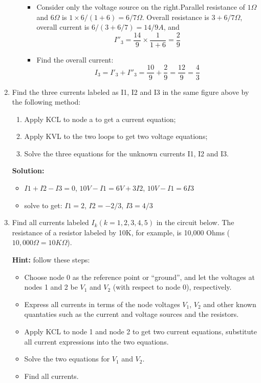 \begin{enumerate}
\begin{enumerate}
\begin{itemize}
\item Consider only the voltage source on the right.Parallel resistance
of $1\Omega$ and $6\Omega$ is $1\times 6/(1+6)=6/7\Omega$. Overall resistance
is $3+6/7\Omega$, overall current is $6/(3+6/7)=14/9A$, and
\[	I''_3=\frac{14}{9}\times \frac{1}{1+6}=\frac{2}{9} \]

\item Find the overall current:
\[	I_3=I'_3+I''_3=\frac{10}{9}+\frac{2}{9}=\frac{12}{9}=\frac{4}{3} \]
\end{itemize}
\end{enumerate}

\item Find the three currents labeled as I1, I2 and I3 in the same figure 
	above by the following method:
\begin{enumerate}
\item Apply KCL to node a to get a current equation;
\item Apply KVL to the two loops to get two voltage equations;
\item Solve the three equations for the unknown currents I1, I2 and I3.
\end{enumerate}

{\bf Solution:}
\begin{itemize}
\item $I1+I2-I3=0$, $10V-I1=6V+3I2$, $10V-I1=6I3$
\item solve to get: $I1=2$, $I2=-2/3$, $I3=4/3$
\end{itemize}

\item Find all currents labeled $I_k (k=1,2,3,4,5)$ in the circuit below. 
The resistance of a resistor labeled by 10K, for example, is 10,000
Ohms ($10,000 \Omega=10K\Omega$).

{\bf Hint:} follow these steps:
\begin{itemize}
\item Choose node 0 as the reference point or ``ground'', and let the 
	voltages at nodes 1 and 2 be $V_1$ and $V_2$ (with respect to
	node 0), respectively. 
\item Express all currents in terms of the node voltages $V_1$, $V_2$
	and other known quantaties such as the current and voltage sources
	and the resistors.
\item Apply KCL to node 1 and node 2 to get two current equations, 
	substitute all current expressions into the two equations.
\item Solve the two equations for $V_1$ and $V_2$.
\item Find all currents.
\end{itemize}


\end{enumerate}
